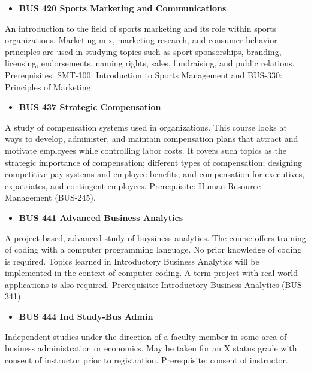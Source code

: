 \documentclass[
  letterpaper,
]{scrbook}
\providecommand{\tightlist}{%
  \setlength{\itemsep}{0pt}\setlength{\parskip}{0pt}}
\begin{document}
\begin{itemize}
\tightlist
\item
  \textbf{BUS 420 Sports Marketing and Communications}
\end{itemize}

An introduction to the field of sports marketing and its role within
sports organizations. Marketing mix, marketing research, and consumer
behavior principles are used in studying topics such as sport
sponsorships, branding, licensing, endorsements, naming rights, sales,
fundraising, and public relations. Prerequisites: SMT-100: Introduction
to Sports Management and BUS-330: Principles of Marketing.

\begin{itemize}
\tightlist
\item
  \textbf{BUS 437 Strategic Compensation}
\end{itemize}

A study of compensation systems used in organizations. This course looks
at ways to develop, administer, and maintain compensation plans that
attract and motivate employees while controlling labor costs. It covers
such topics as the strategic importance of compensation; different types
of compensation; designing competitive pay systems and employee
benefits; and compensation for executives, expatriates, and contingent
employees. Prerequisite: Human Resource Management (BUS-245).

\begin{itemize}
\tightlist
\item
  \textbf{BUS 441 Advanced Business Analytics}
\end{itemize}

A project-based, advanced study of buysiness analytics. The course
offers training of coding with a computer programming language. No prior
knowledge of coding is required. Topics learned in Introductory Business
Analytics will be implemented in the context of computer coding. A term
project with real-world applications is also required. Prerequisite:
Introductory Business Analytics (BUS 341).

\begin{itemize}
\tightlist
\item
  \textbf{BUS 444 Ind Study-Bus Admin}
\end{itemize}

Independent studies under the direction of a faculty member in some area
of business administration or economics. May be taken for an X status
grade with consent of instructor prior to registration. Prerequisite:
consent of instructor.
\end{document}
